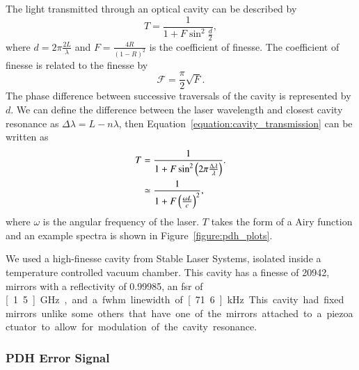 The light transmitted through an optical cavity can be described by~\cite{pedrotti_introduction_2007}
\begin{equation}\label{equation:cavity_transmission}
T = \frac{1}{1+F\sin^2\frac{d}{2}},
\end{equation}
where $d=2\pi\frac{2L}{\lambda}$ and $F=\frac{4R}{\left(1-R\right)^2}$ is the coefficient of finesse.
The coefficient of finesse is related to the finesse by
\begin{equation}
\mathscr{F}=\frac{\pi}{2}\sqrt{F}.
\end{equation}
The phase difference between successive traversals of the cavity is represented by $d$.
We can define the difference between the laser wavelength and closest cavity resonance as $\Delta\lambda=L-n\lambda$, then Equation~\ref{equation:cavity_transmission} can be written as
\begin{align}\label{equation:cavity_transmission2}
T &= \frac{1}{1+F\sin^2\left(2\pi\frac{\Delta\lambda}{\lambda}\right)}. \notag \\
&\simeq \frac{1}{1+F\left(\frac{\omega L}{c}\right)^2},
\end{align}
where $\omega$ is the angular frequency of the laser.
$T$ takes the form of a Airy function and an example spectra is shown in Figure~\ref{figure:pdh_plots}.

We used a high-finesse cavity from Stable Laser Systems, isolated inside a temperature controlled vacuum chamber.
This cavity has a finesse of 20942, mirrors with a reflectivity of 0.99985, an \gls{fsr} of \unit[1.5]{GHz}, and a \gls{fwhm} linewidth of \unit[71.6]{kHz}.
This cavity had fixed mirrors unlike some others that have one of the mirrors attached to a piezoactuator to allow for modulation of the cavity resonance.

\subsubsection{PDH Error Signal}\label{section:pdh_error}

